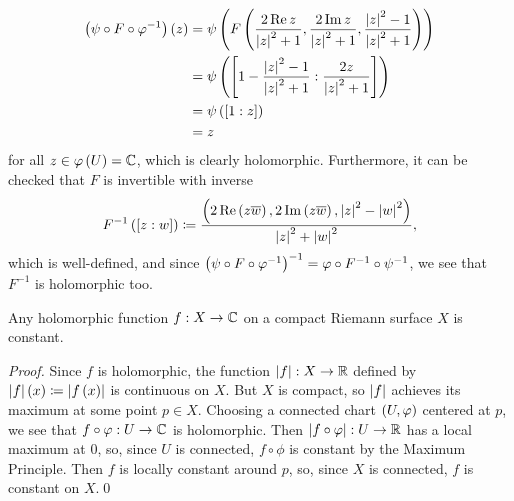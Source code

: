 \documentclass[../Moduli_Spaces_of_Riemann_Surfaces.tex]{subfiles}
\begin{document}
\begin{example}
\begin{equation*}
            \begin{aligned}
                \left(\psi\circ F\circ\varphi^{-1}\right)\left(z\right)&=\psi\left(F\left(\frac{2\operatorname{Re} z}{\left|z\right|^2+1},\frac{2\operatorname{Im} z}{\left|z\right|^2+1},\frac{\left|z\right|^2-1}{\left|z\right|^2+1}\right)\right) \\
                                                      &=\psi\left(\left[1-\frac{\left|z\right|^2-1}{\left|z\right|^2+1}:\frac{2z}{\left|z\right|^2+1}\right]\right) \\
                                                      &=\psi\left(\left[1:z\right]\right) \\
                                                      &=z
            \end{aligned}
        \end{equation*}
        for all $z\in\varphi\left(U\right)=\mathbb{C}$, which is clearly holomorphic. Furthermore, it can be checked that $F$ is invertible with inverse\side{}
        \begin{equation*}
            F^{-1}\left(\left[z:w\right]\right)\coloneqq\frac{\left(2\operatorname{Re}\left(z\overline{w}\right),2\operatorname{Im}\left(z\overline{w}\right),\left|z\right|^2-\left|w\right|^2\right)}{\left|z\right|^2+\left|w\right|^2},
        \end{equation*}
        which is well-defined, and since $\left(\psi\circ F\circ\varphi^{-1}\right)^{-1}=\varphi\circ F^{-1}\circ\psi^{-1}$, we see that $F^{-1}$ is holomorphic too.\exqed
    \end{example}
    \begin{theorem}\label{1.2:thm:holomorphic_compact_constant}
        Any holomorphic function $f:X\to\mathbb{C}$ on a compact Riemann surface $X$ is constant.
    \end{theorem}
    \begin{proof}
        Since $f$ is holomorphic, the function $\left|f\right|:X\to\mathbb{R}$ defined by $\left|f\right|\left(x\right)\coloneqq\left|f\left(x\right)\right|$ is continuous on $X$. But $X$ is compact, so $\left|f\right|$ achieves its maximum at some point $p\in X$. Choosing a connected chart $\left(U,\varphi\right)$ centered at $p$, we see that $f\circ\varphi:U\to\mathbb{C}$ is holomorphic. Then $\left|f\circ\varphi\right|:U\to\mathbb{R}$ has a local maximum at $0$, so, since $U$ is connected, $f\circ\phi$ is constant by the Maximum Principle. Then $f$ is locally constant around $p$, so, since $X$ is connected, $f$ is constant on $X$.\qed
    \end{proof}
\end{document}
